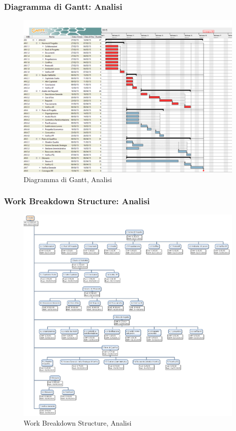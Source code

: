 \subsubsection{Diagramma di Gantt: Analisi}
\begin{figure}[h] 
	\centering
	\includegraphics[width=\textwidth]{./img/analisi.png}
	\caption{Diagramma di Gantt, Analisi}
	\label{fig1}
\end{figure}

\newpage
\subsubsection{Work Breakdown Structure: Analisi}
\begin{figure}[h]
	\centering
	\includegraphics[width=\textwidth]{./img/wbs_analisi.png}
	\caption{Work Breakdown Structure, Analisi}
\end{figure}


